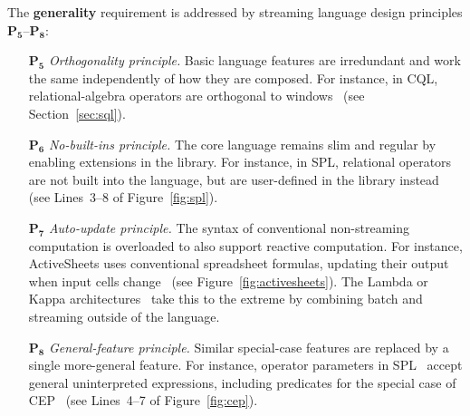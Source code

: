 The \textbf{generality} requirement is addressed by streaming language
design principles $\mathbf{P_5}$--$\mathbf{P_8}$:
\begin{itemize}
  \item[$\mathbf{P_5}$] \emph{Orthogonality principle.} Basic language
    features are irredundant and work the same independently of how
    they are composed. For instance, in CQL, relational-algebra
    operators are orthogonal to windows~\cite{arasu_babu_widom_2006}
    (see Section~\ref{sec:sql}).
  \item[$\mathbf{P_6}$] \emph{No-built-ins principle.} The core language
    remains slim and regular by enabling extensions in the library. For
    instance, in SPL, relational operators are not built into the
    language, but are user-defined in the library
    instead~\cite{hirzel_schneider_gedik_2017} (see \mbox{Lines 3--8}
    of Figure~\ref{fig:spl}).
  \item[$\mathbf{P_7}$] \emph{Auto-update principle.} The syntax of
    conventional non-streaming computation is overloaded to also
    support reactive computation. For instance, ActiveSheets uses
    conventional spreadsheet formulas, updating their output when
    input cells change~\cite{vaziri_et_al_2014} (see
    Figure~\ref{fig:activesheets}).  The Lambda or Kappa
    architectures~\cite{kreps_2014} take this to the extreme by
    combining batch and streaming outside of the language.
  \item[$\mathbf{P_8}$] \emph{General-feature principle.} Similar
    special-case features are replaced by a single more-general
    feature. For instance, operator parameters in
    SPL~\cite{hirzel_schneider_gedik_2017} accept general
    uninterpreted expressions, including predicates for the special
    case of CEP~\cite{hirzel_2012} (see \mbox{Lines 4--7} of
    Figure~\ref{fig:cep}).
\end{itemize}

